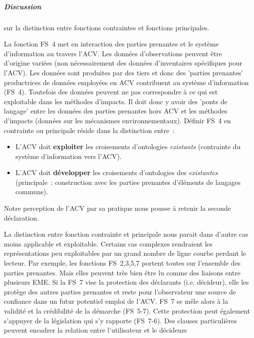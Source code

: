 \subparagraph{Discussion} sur la distinction entre fonctions contraintes et fonctions principales.

La fonction FS~4 met en interaction des parties prenantes et le système d'information au travers l'\gls{ACV}.
Les données d'observations peuvent être d'origine variées (non nécessairement des données d'inventaires spécifiques pour l'\gls{ACV}).
Les données sont produites par des tiers et donc des 'parties prenantes' productrices de données employées en \gls{ACV} contribuent au système d'information (FS~4).
Toutefois des données peuvent ne pas correspondre à ce qui est exploitable dans les méthodes d'impacts. %
Il doit donc y avoir des 'ponts de langage' entre les données des parties prenantes hors \gls{ACV} et les méthodes d'impacts (données sur les mécanismes environnementaux).
Définir FS~4 en contrainte ou principale réside dans la distinction entre~:
\begin{itemize}
\item L'\gls{ACV} doit \textbf{exploiter} les croisements d'ontologies \emph{existants} (contrainte du système d'information vers l'\gls{ACV}).
\item L'\gls{ACV} doit \textbf{développer} les croisements d'ontologies des \emph{existantes} (principale~: construction avec les parties prenantes d'éléments de langages communs).
\end{itemize}
Notre perception de l'\gls{ACV} par sa pratique nous pousse à retenir la seconde déclaration.

La distinction entre fonction contrainte et principale nous parait dans d'autre cas moins applicable et exploitable.
Certains cas complexes rendraient les représentations peu exploitables par un grand nombre de ligne courbe perdant le lecteur.
Par exemple, les fonctions FS~2,3,5,7 portent toutes sur l'ensemble des parties prenantes.
Mais elles peuvent très bien être lu comme des liaisons entre plusieurs EME.
Si la FS~7 vise la protection des déclarants (i.e. décideur), elle les protège des autres parties prenantes et reste pour l'observateur une source de confiance dans un futur potentiel emploi de l'\gls{ACV}.
FS~7 se mêle alors à la validité et la crédibilité de la démarche (FS~5-7).
Cette protection peut également s'appuyer de la législation qui s'y rapporte (FS~7-6).
Des clauses particulières peuvent encadrer la relation entre l'utilisateur et le décideurs

